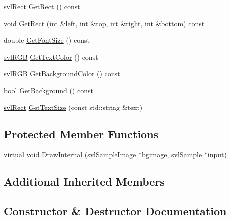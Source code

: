 \begin{DoxyCompactItemize}
\item 
\hyperlink{structsvl_rect}{svl\+Rect} \hyperlink{classsvl_overlay_static_text_a67aa31e47cd5bbc9851cc9e9bffa94b9}{Get\+Rect} () const 
\item 
void \hyperlink{classsvl_overlay_static_text_a50a58dac081cfb45a2175b606ff6ca06}{Get\+Rect} (int \&left, int \&top, int \&right, int \&bottom) const 
\item 
double \hyperlink{classsvl_overlay_static_text_ad9eafddb8965da5f8868fd39cfee4453}{Get\+Font\+Size} () const 
\item 
\hyperlink{structsvl_r_g_b}{svl\+R\+G\+B} \hyperlink{classsvl_overlay_static_text_a1d5badf4b9cf0566c29171e7dd61d0f4}{Get\+Text\+Color} () const 
\item 
\hyperlink{structsvl_r_g_b}{svl\+R\+G\+B} \hyperlink{classsvl_overlay_static_text_a20c0b4378d8036fafaba97b59aa7da7d}{Get\+Background\+Color} () const 
\item 
bool \hyperlink{classsvl_overlay_static_text_add5d739f2993eaa400c7fdbef067ce7b}{Get\+Background} () const 
\item 
\hyperlink{structsvl_rect}{svl\+Rect} \hyperlink{classsvl_overlay_static_text_a9a17b385584564646675d69526a40617}{Get\+Text\+Size} (const std\+::string \&text)
\end{DoxyCompactItemize}
\subsection*{Protected Member Functions}
\begin{DoxyCompactItemize}
\item 
virtual void \hyperlink{classsvl_overlay_static_text_aaa85a4335f542db5815d5dac71c7dc8b}{Draw\+Internal} (\hyperlink{classsvl_sample_image}{svl\+Sample\+Image} $\ast$bgimage, \hyperlink{classsvl_sample}{svl\+Sample} $\ast$input)
\end{DoxyCompactItemize}
\subsection*{Additional Inherited Members}


\subsection{Constructor \& Destructor Documentation}
\hypertarget{classsvl_overlay_static_text_add1b84facba4a2e4d8ef8a72adb0d3bd}{}
